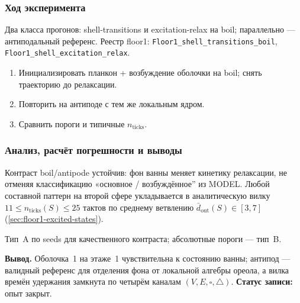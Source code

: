 \subsubsection*{Ход эксперимента}
Два класса прогонов: shell-transitions и excitation-relax на boil; параллельно --- антиподальный референс.
Реестр floor1: \texttt{Floor1\_shell\_transitions\_boil}, \texttt{Floor1\_shell\_excitation\_relax}.

\begin{enumerate}[label=\textbf{Шаг \arabic*:},leftmargin=*,itemsep=0.35em]
\item Инициализировать планкон + возбуждение оболочки на boil; снять траекторию до релаксации.
\item Повторить на антиподе с тем же локальным ядром.
\item Сравнить пороги и типичные $n_{\mathrm{ticks}}$.
\end{enumerate}

\subsubsection*{Анализ, расчёт погрешности и выводы}
Контраст boil/antipode устойчив: фон ванны меняет кинетику релаксации, не отменяя классификацию «основное / возбуждённое'' из MODEL.
Любой составной паттерн на второй сфере укладывается в аналитическую вилку $11 \le n_{\mathrm{ticks}}(S) \le 25$ тактов по среднему ветвлению $\bar d_{\mathrm{out}}(S)\in[3,7]$ (\cref{sec:floor1-excited-states}).

Тип~A по seeds для качественного контраста; абсолютные пороги --- тип~B.

\textbf{Вывод.}
Оболочка~1 на этаже~1 чувствительна к состоянию ванны; антипод --- валидный референс для отделения фона от локальной алгебры ореола, а вилка времён удержания замкнута по четырём каналам $(V,E,\square,\triangle)$.
\textbf{Статус записи:} опыт закрыт.
